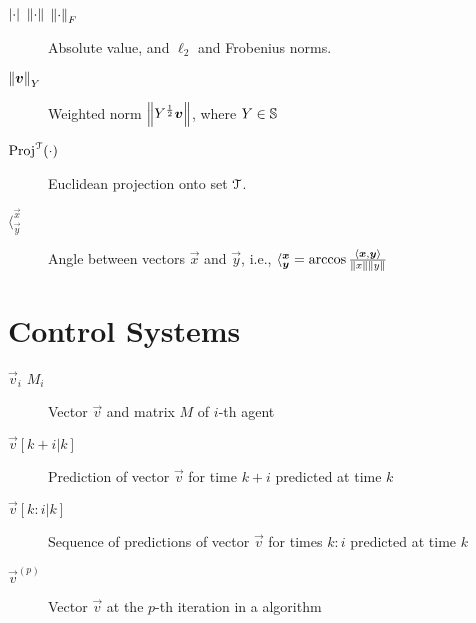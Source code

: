 \begin{description}
  \item[$\left\lvert\cdot\right\rvert$ $\left\lVert\cdot\right\rVert$ $\left\lVert\cdot\right\rVert_{F}$] Absolute value, and $\ell_{2}$ and Frobenius norms. \item[$\left\lVert\boldsymbol{v}\right\rVert_{Y}$] Weighted norm $\left\lVert Y^{\frac{1}{2}}\boldsymbol{v}\right\rVert$, where ${Y\in\mathbb{S}}$
  \item[$\operatorname{Proj}^{\mathcal{T}}(\cdot)$] Euclidean projection onto set $\mathcal{T}$.
  \item[$\langle_{\vec{y}}^{\vec{x}}$] Angle between vectors $\vec{x}$ and $\vec{y}$, i.e., ${\langle    _{\boldsymbol{y}}^{\boldsymbol{x}}}=\arccos\frac{\langle\boldsymbol{x},\boldsymbol{y}\rangle}{\left\lVert x\right\rVert\left\lVert y\right\rVert}$



\end{description}

\section*{Control Systems}

\begin{description}

  \item[$\vec{v}_{i}$ $M_{i}$] Vector $\vec{v}$ and matrix $M$ of $i$-th agent
  \item[${\vec{v}[k+i|k]}$] Prediction of vector $\vec{v}$ for time ${k+i}$ predicted at time $k$
  \item[${\vec{v}[k:i|k]}$] Sequence of predictions of vector $\vec{v}$ for times $k:i$ predicted at time $k$
  \item[$\vec{v}^{(p)}$ ] Vector $\vec{v}$ at the $p$-th iteration in a algorithm
\end{description}

